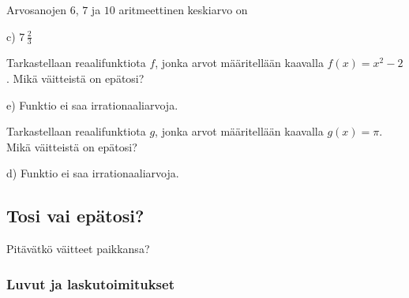 \begin{tehtava}
Arvosanojen $6$, $7$ ja $10$ aritmeettinen keskiarvo on
	\begin{vastaus}
	c) $7\,\frac{2}{3}$
	\end{vastaus}
\end{tehtava}

\begin{tehtava}
Tarkastellaan reaalifunktiota $f$, jonka arvot määritellään kaavalla $f(x)=x^2-2$. Mikä väitteistä on epätosi?
	\begin{vastaus}
	e) Funktio ei saa irrationaaliarvoja.
	\end{vastaus}
\end{tehtava}

\begin{tehtava}
Tarkastellaan reaalifunktiota $g$, jonka arvot määritellään kaavalla $g(x)=\pi$. Mikä väitteistä on epätosi?
	\begin{vastaus}
	d) Funktio ei saa irrationaaliarvoja.
	\end{vastaus}
\end{tehtava}


\subsection*{Tosi vai epätosi?}

Pitävätkö väitteet paikkansa?

\subsubsection*{Luvut ja laskutoimitukset}

